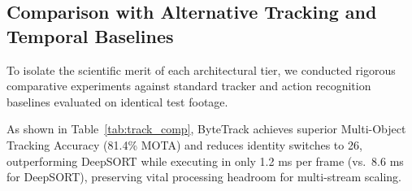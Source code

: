 \documentclass[conference]{IEEEtran}
\begin{document}
\subsection{Comparison with Alternative Tracking and Temporal Baselines}

To isolate the scientific merit of each architectural tier, we conducted rigorous comparative experiments against standard tracker and action recognition baselines evaluated on identical test footage.

\begin{table}[htbp]
\centering
\caption{Tracking Algorithm Comparison on CCTV Benchmark}
\label{tab:track_comp}
\end{table}

As shown in Table~\ref{tab:track_comp}, ByteTrack achieves superior Multi-Object Tracking Accuracy (81.4\% MOTA) and reduces identity switches to 26, outperforming DeepSORT while executing in only 1.2 ms per frame (vs.\ 8.6 ms for DeepSORT), preserving vital processing headroom for multi-stream scaling.

\begin{table}[htbp]
\centering
\caption{Event Reasoning Engine vs. Learned Action Models}
\label{tab:action_comp}
\end{table}
\end{document}

